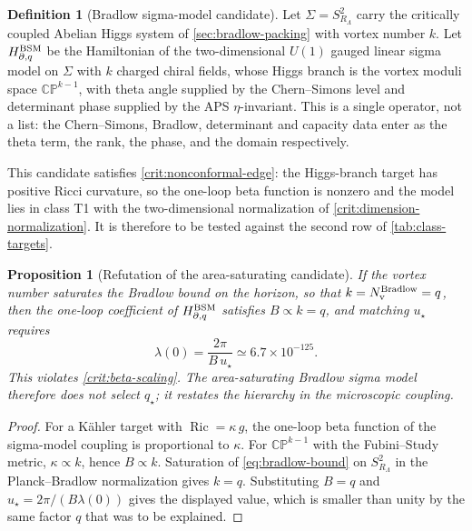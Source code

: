 \documentclass[aps,prd,reprint,nofootinbib,superscriptaddress,floatfix]{revtex4-2}
\numberwithin{equation}{section}
\theoremstyle{definition}
\newtheorem{definition}{Definition}[section]
\theoremstyle{plain}
\newtheorem{proposition}{Proposition}[section]
\begin{document}
\begin{definition}[Bradlow sigma-model candidate]
\label{def:bradlow-sigma-candidate}
Let \(\Sigma=S^2_{R_\Lambda}\) carry the critically coupled Abelian Higgs
system of \cref{sec:bradlow-packing} with vortex number \(k\).  Let
\(H_{\partial,q}^{\rm BSM}\) be the Hamiltonian of the two-dimensional
\(U(1)\) gauged linear sigma model on \(\Sigma\) with \(k\) charged chiral
fields, whose Higgs branch is the vortex moduli space
\(\mathbb{CP}^{k-1}\), with theta angle supplied by the Chern--Simons level
and determinant phase supplied by the APS \(\eta\)-invariant.  This is a
single operator, not a list: the Chern--Simons, Bradlow, determinant and
capacity data enter as the theta term, the rank, the phase, and the domain
respectively.
\end{definition}

This candidate satisfies \cref{crit:nonconformal-edge}: the Higgs-branch
target has positive Ricci curvature, so the one-loop beta function is
nonzero and the model lies in class T1 with the two-dimensional
normalization of \cref{crit:dimension-normalization}.  It is therefore to be
tested against the second row of \cref{tab:class-targets}.

\begin{proposition}[Refutation of the area-saturating candidate]
\label{prop:bsm-refutation}
If the vortex number saturates the Bradlow bound on the horizon, so that
\(k=N_{\rm v}^{\rm Bradlow}=q\), then the one-loop coefficient of
\(H_{\partial,q}^{\rm BSM}\) satisfies \(B\propto k=q\), and matching
\(u_\star\) requires
\begin{equation}
\lambda(0)=\frac{2\pi}{B\,u_\star}
\simeq
6.7\times10^{-125}.
\end{equation}
This violates \cref{crit:beta-scaling}.  The area-saturating Bradlow sigma
model therefore does not select \(q_\star\); it restates the hierarchy in the
microscopic coupling.
\end{proposition}

\begin{proof}
For a Kähler target with \(\operatorname{Ric}=\kappa\,g\), the one-loop beta
function of the sigma-model coupling is proportional to \(\kappa\).  For
\(\mathbb{CP}^{k-1}\) with the Fubini--Study metric, \(\kappa\propto k\),
hence \(B\propto k\).  Saturation of \cref{eq:bradlow-bound} on
\(S^2_{R_\Lambda}\) in the Planck--Bradlow normalization gives \(k=q\).
Substituting \(B=q\) and \(u_\star=2\pi/(B\lambda(0))\) gives the displayed
value, which is smaller than unity by the same factor \(q\) that was to be
explained.
\end{proof}
\end{document}
